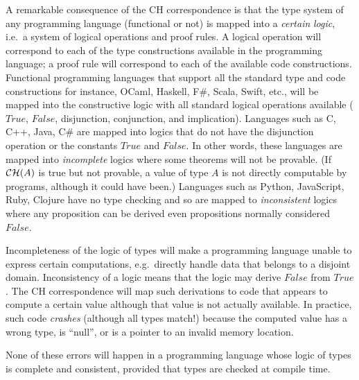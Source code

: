 A remarkable consequence of the CH correspondence is that the type
system of any programming language (functional or not) is mapped into
a \emph{certain} \emph{logic}, i.e.~a system of logical operations
and proof rules. A logical operation will correspond to each of the
type constructions available in the programming language; a proof
rule will correspond to each of the available code constructions.
Functional programming languages that support all the standard type
and code constructions \textendash{} for instance, OCaml, Haskell,
F\#, Scala, Swift, etc., \textendash{} will be mapped into the constructive
logic with all standard logical operations available ($True$, $False$,
disjunction, conjunction, and implication). Languages such as C, C++,
Java, C\# are mapped into logics that do not have the disjunction
operation or the constants $True$ and $False$. In other words, these
languages are mapped into \emph{incomplete} logics where some theorems
will not be provable. (If ${\cal CH}(A)$ is true but not provable,
a value of type $A$ is not directly computable by programs, although
it could have been.) Languages such as Python, JavaScript, Ruby, Clojure
have no type checking and so are mapped to \emph{inconsistent} logics
where any proposition can be derived \textendash{} even propositions
normally considered $False$. 

Incompleteness of the logic of types will make a programming language
unable to express certain computations, e.g.~directly handle data
that belongs to a disjoint domain. Inconsistency of a logic means
that the logic may derive $False$ from $True$. The CH correspondence
will map such derivations to code that appears to compute a certain
value although that value is not actually available. In practice,
such code \emph{crashes} (although all types match!) because the computed
value has a wrong type, is ``null'', or is a pointer to an invalid
memory location.

None of these errors will happen in a programming language whose logic
of types is complete and consistent, provided that types are checked
at compile time. 

